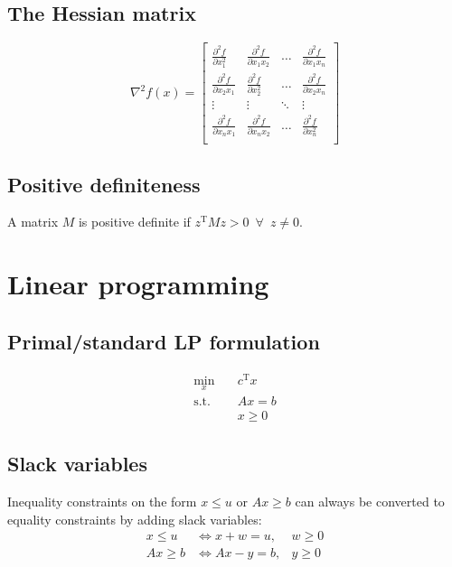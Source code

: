 \documentclass[a4paper, 12pt]{article}
\theoremstyle{definition}
\newcommand{\pdder}[2]{\frac{\partial^2#1}{\partial#2}}
\newcommand{\T}{^{\scriptscriptstyle \text{T}}}
\newcommand{\enforall}{\enspace \forall \enspace}
\begin{document}
\subsection{The Hessian matrix}
\begin{equation}
	\nabla^2 f(x)
	=
	\begin{bmatrix}
	\pdder{f}{x_1^2}  & \pdder{f}{x_1x_2} & \ldots & \pdder{f}{x_1x_n} \\[10pt]
	\pdder{f}{x_2x_1} & \pdder{f}{x_2^2}  & \ldots & \pdder{f}{x_2x_n} \\
	\vdots            & \vdots            & \ddots & \vdots            \\[3pt]
	\pdder{f}{x_nx_1} & \pdder{f}{x_nx_2} & \ldots & \pdder{f}{x_n^2}  \\
	\end{bmatrix}
\end{equation}

\subsection{Positive definiteness}
A matrix \(M\) is positive definite if \(z\T M z > 0 \enforall z \neq 0\).

\section{Linear programming}
\subsection{Primal/standard LP formulation}
\begin{equation}\label{eq:lp}
	\begin{aligned}
		\underset{x}{\min}	& \quad c\T x \\
		\text{s.t.}					& \quad A x = b \\
												& \quad x \geq 0
	\end{aligned}
\end{equation}



\subsection{Slack variables}
Inequality constraints on the form \(x \leq u\) or \(A x \geq b\) can always be converted to equality constraints by adding slack variables:
\begin{equation}
	\begin{aligned}
		x \leq u		&\Leftrightarrow x + w = u,		&w \geq 0 \\
		A x \geq b	&\Leftrightarrow A x - y = b,	&y \geq 0
	\end{aligned}
\end{equation}
\end{document}
